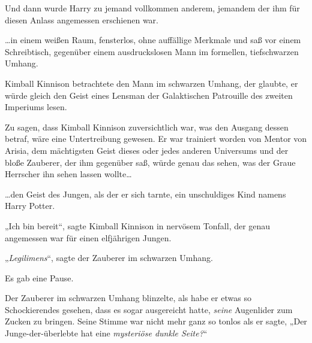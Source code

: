 Und dann wurde Harry zu jemand vollkommen anderem, jemandem der ihm für diesen Anlass angemessen erschienen war.

…in einem weißen Raum, fensterlos, ohne auffällige Merkmale und saß vor einem Schreibtisch, gegenüber einem ausdruckslosen Mann im formellen, tiefschwarzen Umhang.

Kimball Kinnison betrachtete den Mann im schwarzen Umhang, der glaubte, er würde gleich den Geist eines Lensman der Galaktischen Patrouille des zweiten Imperiums lesen.

Zu sagen, dass Kimball Kinnison zuversichtlich war, was den Ausgang dessen betraf, wäre eine Untertreibung gewesen. Er war trainiert worden von Mentor von Arisia, dem mächtigsten Geist dieses oder jedes anderen Universums und der bloße Zauberer, der ihm gegenüber saß, würde genau das sehen, was der Graue Herrscher ihn sehen lassen wollte…

…den Geist des Jungen, als der er sich tarnte, ein unschuldiges Kind namens Harry Potter.

„Ich bin bereit“, sagte Kimball Kinnison in nervösem Tonfall, der genau angemessen war für einen elfjährigen Jungen.

„\emph{Legilimens}“, sagte der Zauberer im schwarzen Umhang.

Es gab eine Pause.

Der Zauberer im schwarzen Umhang blinzelte, als habe er etwas so Schockierendes gesehen, dass es sogar ausgereicht hatte, \emph{seine} Augenlider zum Zucken zu bringen. Seine Stimme war nicht mehr ganz so tonlos als er sagte, „Der Junge-der-überlebte hat eine \emph{mysteriöse dunkle Seite?}“

